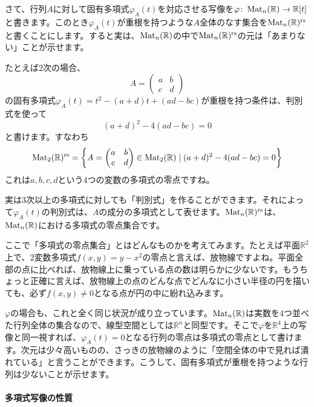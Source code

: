 さて、行列$A$に対して固有多項式$\varphi_A(t)$を対応させる写像を$\varphi\colon \operatorname{Mat}_n(\mathbb{R}) \rightarrow \mathbb{R}[t]$と書きます。このとき$\varphi_A(t)$が重根を持つような$A$全体のなす集合を$\operatorname{Mat}_n(\mathbb{R})^{\text{rs}}$と書くことにします。すると実は、$\operatorname{Mat}_n(\mathbb{R})$の中で$\operatorname{Mat}_n(\mathbb{R})^{\text{rs}}$の元は「あまりない」ことが示せます。

たとえば$2$次の場合、
\[
A = 
\begin{pmatrix}
a & b \\
c & d
\end{pmatrix}
\]
の固有多項式$\varphi_A(t) = t^2 - (a + d)t + (ad - bc)$が重根を持つ条件は、判別式を使って
\[
(a + d)^2 - 4(ad - bc) = 0
\]
と書けます。すなわち
\[
\operatorname{Mat}_2(\mathbb{R})^{\text{rs}} =
\biggl\{
A = 
\begin{pmatrix}
a & b \\
c & d
\end{pmatrix}
\in \operatorname{Mat}_2(\mathbb{R})
\mid
(a + d)^2 - 4(ad - bc) = 0
\biggr\}
\]
これは$a, b, c, d$という$4$つの変数の多項式の零点ですね。

実は$3$次以上の多項式に対しても「判別式」を作ることができます。それによって$\varphi_A(t)$の判別式は、$A$の成分の多項式として表せます。$\operatorname{Mat}_n(\mathbb{R})^{\text{rs}}$は、$\operatorname{Mat}_n(\mathbb{R})$における多項式の零点集合です。

ここで「多項式の零点集合」とはどんなものかを考えてみます。たとえば平面$\mathbb{R}^2$上で、$2$変数多項式$f(x, y) = y - x^2$の零点と言えば、放物線ですよね。平面全部の点に比べれば、放物線上に乗っている点の数は明らかに少ないです。もうちょっと正確に言えば、放物線上の点のどんな点でどんなに小さい半径の円を描いても、必ず$f(x, y) \neq 0$となる点が円の中に紛れ込みます。

$\varphi$の場合も、これと全く同じ状況が成り立っています。$\operatorname{Mat}_n(\mathbb{R})$は実数を$4$つ並べた行列全体の集合なので、線型空間としては$\mathbb{R}^n$と同型です。そこで$\varphi$を$\mathbb{R}^4$上の写像と同一視すれば、$\varphi_A(t) = 0$となる行列の零点は多項式の零点として書けます。次元は少々高いものの、さっきの放物線のように「空間全体の中で見れば潰れている」と言うことができます。こうして、固有多項式が重根を持つような行列は少ないことが示せます。

\paragraph{多項式写像の性質}

